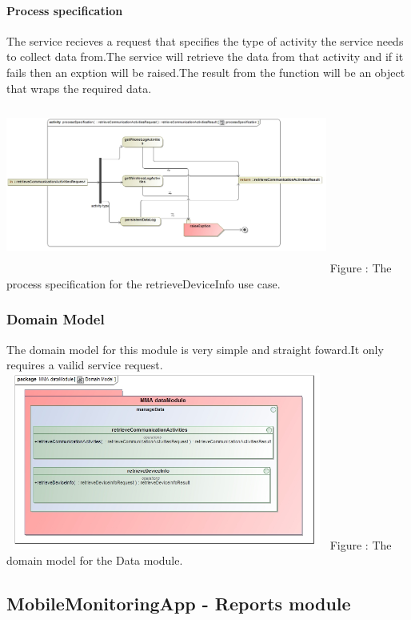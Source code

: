 \documentclass[hidelinks, 12pt, oneside]{article}
\begin{document}
			\paragraph{Process specification}
			The  service recieves a request that specifies the type of activity the service needs to collect data from.The service will retrieve the data from that activity and if it fails then an exption will be raised.The result from the function will be an object that wraps the required data.\newline
			\includegraphics[width=400px,height=220px]{img/processSpecificationRetrieveCommunicationActivities.jpg}
			Figure : The process specification for the retrieveDeviceInfo use case.
			
	
		\subsubsection{Domain Model}
		
		The domain model for this module is very simple and straight foward.It only requires a vailid service request.\newline
		\includegraphics[width=400px,height=220px]{img/DomainModelDataModule.jpg}
		Figure : The domain model for the Data module.
		
	\subsection{MobileMonitoringApp - Reports module}
\end{document}
